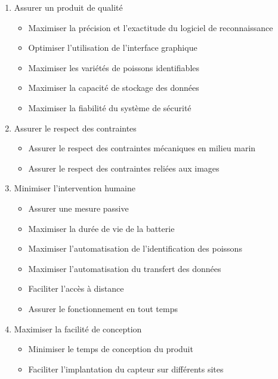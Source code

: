 \begin{enumerate}

    \item Assurer un produit de qualité
    \begin{itemize}
        \item Maximiser la précision et l'exactitude du logiciel de reconnaissance 
        \item Optimiser l'utilisation de l'interface graphique
        \item Maximiser les variétés de poissons identifiables
        \item Maximiser la capacité de stockage des données
        \item Maximiser la fiabilité du système de sécurité
    \end{itemize}
    
    \item Assurer le respect des contraintes
    \begin{itemize}
        \item Assurer le respect des contraintes mécaniques en milieu marin
        \item Assurer le respect des contraintes reliées aux images
    \end{itemize}

    \item Minimiser l'intervention humaine
    \begin{itemize}
        \item Assurer une mesure passive
        \item Maximiser la durée de vie de la batterie
        \item Maximiser l'automatisation de l'identification des poissons
        \item Maximiser l'automatisation du transfert des données
        \item Faciliter l'accès à distance
        \item Assurer le fonctionnement en tout temps
    \end{itemize}
    
    \item Maximiser la facilité de conception
    \begin{itemize}
        \item Minimiser le temps de conception du produit
        \item Faciliter l'implantation du capteur sur différents sites
    \end{itemize}
    

\end{enumerate}
